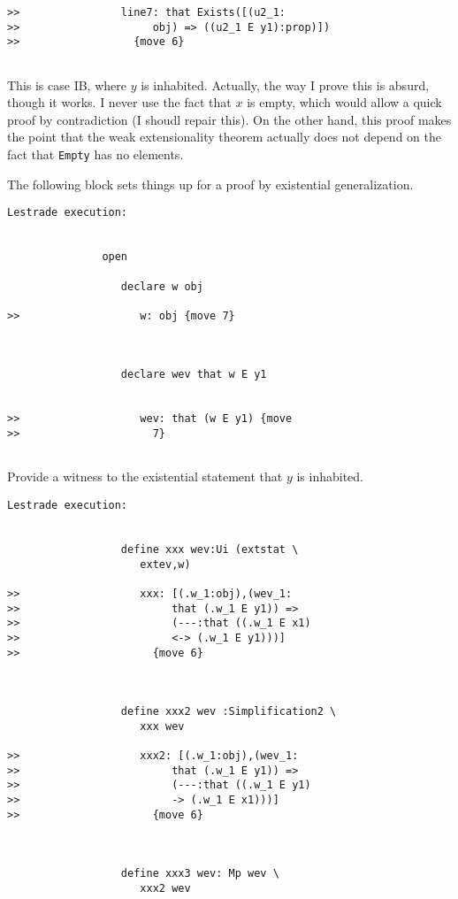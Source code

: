 \documentclass{article}
\begin{document}
{\begin{verbatim}
>>                line7: that Exists([(u2_1:
>>                     obj) => ((u2_1 E y1):prop)])
>>                  {move 6}


\end{verbatim}

This is case IB, where $y$ is inhabited.  Actually, the way I prove this is absurd, though it works.  I never use the fact that $x$ is empty, which would allow a quick proof by contradiction (I shoudl repair this).  On the other hand, this proof makes the point that the weak extensionality theorem actually does not depend on the fact that {\tt Empty} has no elements.

The following block sets things up for a proof by existential generalization.

\begin{verbatim}Lestrade execution:


               open

                  declare w obj

>>                   w: obj {move 7}



                  declare wev that w E y1


>>                   wev: that (w E y1) {move
>>                     7}


\end{verbatim}

Provide a witness to the existential statement that $y$ is inhabited.

\begin{verbatim}Lestrade execution:


                  define xxx wev:Ui (extstat \
                     extev,w)

>>                   xxx: [(.w_1:obj),(wev_1:
>>                        that (.w_1 E y1)) =>
>>                        (---:that ((.w_1 E x1)
>>                        <-> (.w_1 E y1)))]
>>                     {move 6}



                  define xxx2 wev :Simplification2 \
                     xxx wev

>>                   xxx2: [(.w_1:obj),(wev_1:
>>                        that (.w_1 E y1)) =>
>>                        (---:that ((.w_1 E y1)
>>                        -> (.w_1 E x1)))]
>>                     {move 6}



                  define xxx3 wev: Mp wev \
                     xxx2 wev


\end{verbatim}}
\end{document}

